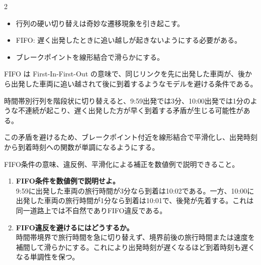 \begin{multicols}{2}

\footnotesize

\raggedcolumns


\begin{itemize}
\item 行列の硬い切り替えは奇妙な遷移現象を引き起こす。
\item FIFO: 遅く出発したときに追い越しが起きないようにする必要がある。
\item ブレークポイントを線形結合で滑らかにする。
\end{itemize}

FIFO は First-In-First-Out の意味で、同じリンクを先に出発した車両が、後から出発した車両に追い越されて後に到着するようなモデルを避ける条件である。\par

時間帯別行列を階段状に切り替えると、9:59出発では3分、10:00出発では1分のような不連続が起こり、遅く出発した方が早く到着する矛盾が生じる可能性がある。\par

この矛盾を避けるため、ブレークポイント付近を線形結合で平滑化し、出発時刻から到着時刻への関数が単調になるようにする。\par

FIFO条件の意味、違反例、平滑化による補正を数値例で説明できること。\par


\begin{enumerate}
\item \textbf{FIFO条件を数値例で説明せよ。}\\
9:59に出発した車両の旅行時間が3分なら到着は10:02である。一方、10:00に出発した車両の旅行時間が1分なら到着は10:01で、後発が先着する。これは同一道路上では不自然でありFIFO違反である。
\item \textbf{FIFO違反を避けるにはどうするか。}\\
時間帯境界で旅行時間を急に切り替えず、境界前後の旅行時間または速度を補間して滑らかにする。これにより出発時刻が遅くなるほど到着時刻も遅くなる単調性を保つ。
\end{enumerate}

\end{multicols}

